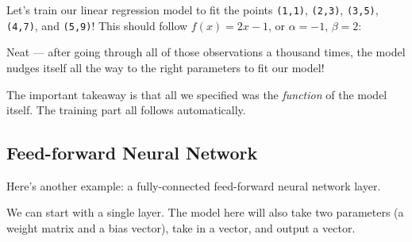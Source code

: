 \documentclass[]{article}
\newenvironment{Shaded}{}{}
\newcommand{\CommentTok}[1]{\textcolor[rgb]{0.38,0.63,0.69}{\textit{#1}}}
\newcommand{\DecValTok}[1]{\textcolor[rgb]{0.25,0.63,0.44}{#1}}
\newcommand{\FloatTok}[1]{\textcolor[rgb]{0.25,0.63,0.44}{#1}}
\newcommand{\FunctionTok}[1]{\textcolor[rgb]{0.02,0.16,0.49}{#1}}
\newcommand{\NormalTok}[1]{#1}
\newcommand{\OperatorTok}[1]{\textcolor[rgb]{0.40,0.40,0.40}{#1}}
\newcommand{\OtherTok}[1]{\textcolor[rgb]{0.00,0.44,0.13}{#1}}
\begin{document}
Let's train our linear regression model to fit the points \texttt{(1,1)},
\texttt{(2,3)}, \texttt{(3,5)}, \texttt{(4,7)}, and \texttt{(5,9)}! This should
follow \(f(x) = 2 x - 1\), or \(\alpha = -1,\, \beta = 2\):

\begin{Shaded}
\end{Shaded}

Neat --- after going through all of those observations a thousand times, the
model nudges itself all the way to the right parameters to fit our model!

The important takeaway is that all we specified was the \emph{function} of the
model itself. The training part all follows automatically.

\subsection{Feed-forward Neural Network}\label{feed-forward-neural-network}

Here's another example: a fully-connected feed-forward neural network layer.

We can start with a single layer. The model here will also take two parameters
(a weight matrix and a bias vector), take in a vector, and output a vector.
\end{document}

